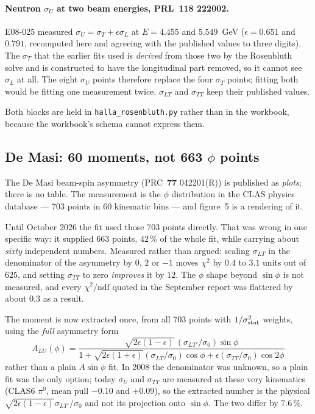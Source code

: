 \documentclass[11pt,a4paper]{article}
\newcommand{\sig}[1]{\sigma_{#1}}
\begin{document}
\paragraph{Neutron $\sig{U}$ at two beam energies, PRL~\textbf{118} 222002.}
E08-025 measured $\sig{U} = \sig{T} + \epsilon\sig{L}$ at $E = 4.455$ and
$5.549$~GeV ($\epsilon = 0.651$ and $0.791$, recomputed here and agreeing with
the published values to three digits).  The $\sig{T}$ that the earlier fits used
is \emph{derived} from those two by the Rosenbluth solve and is constructed to
have the longitudinal part removed, so it cannot see $\sig{L}$ at all.  The
eight $\sig{U}$ points therefore replace the four $\sig{T}$ points; fitting both
would be fitting one measurement twice.  $\sig{LT}$ and $\sig{TT}$ keep their
published values.

Both blocks are held in \texttt{halla\_rosenbluth.py} rather than in the
workbook, because the workbook's schema cannot express them.

\subsection{De Masi: 60 moments, not 663 $\phi$ points}
\label{sec:demasi}

The De Masi beam-spin asymmetry (PRC~\textbf{77} 042201(R)) is published as
\emph{plots}; there is no table.  The measurement is the $\phi$ distribution in
the CLAS physics database --- 703 points in 60 kinematic bins --- and figure~5
is a rendering of it.

Until October 2026 the fit used those 703 points directly.  That was wrong in
one specific way: it supplied 663 points, $42\,\%$ of the whole fit, while
carrying about \emph{sixty} independent numbers.  Measured rather than argued:
scaling $\sig{LT}$ in the denominator of the asymmetry by $0$, $2$ or $-1$ moves
$\chi^2$ by $0.4$ to $3.1$ units out of $625$, and setting $\sig{TT}$ to zero
\emph{improves} it by $12$.  The $\phi$ shape beyond $\sin\phi$ is not measured,
and every $\chi^2/\mathrm{ndf}$ quoted in the September report was flattered by
about $0.3$ as a result.

The moment is now extracted once, from all 703 points with $1/\sigma_{\rm
stat}^2$ weights, using the \emph{full} asymmetry form
\begin{equation}
A_{LU}(\phi) = \frac{\sqrt{2\epsilon(1-\epsilon)}\,(\sig{LT'}/\sigma_0)\sin\phi}
{1 + \sqrt{2\epsilon(1+\epsilon)}(\sig{LT}/\sigma_0)\cos\phi
   + \epsilon(\sig{TT}/\sigma_0)\cos 2\phi}
\label{eq:alu}
\end{equation}
rather than a plain $A\sin\phi$ fit.  In 2008 the denominator was unknown, so a
plain fit was the only option; today $\sig{U}$ and $\sig{TT}$ are measured at
these very kinematics (CLAS6 $\pi^0$, mean pull $-0.10$ and $+0.09$), so the
extracted number is the physical
$\sqrt{2\epsilon(1-\epsilon)}\sig{LT'}/\sigma_0$ and not its projection onto
$\sin\phi$.  The two differ by $7.6\,\%$.
\end{document}
